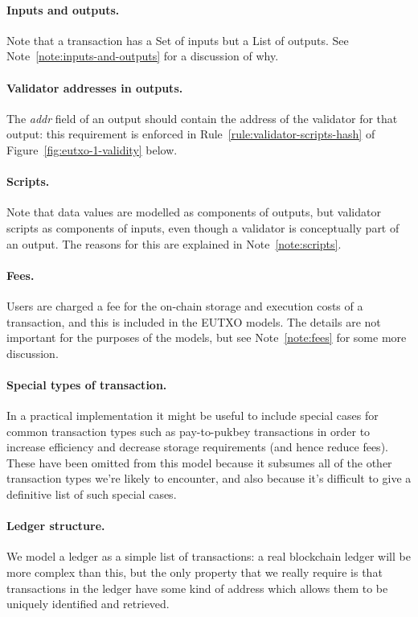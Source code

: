 \documentclass[a4paper]{article}
\newcounter{note}
\begin{document}
\paragraph{Inputs and outputs.} Note that a transaction has a
\textsf{Set} of inputs but a \textsf{List} of outputs. See
Note~\ref{note:inputs-and-outputs} for a discussion of why.

\paragraph{Validator addresses in outputs.} The \textit{addr} field
of an output should contain the address of the validator for
that output: this requirement is enforced in
Rule~\ref{rule:validator-scripts-hash} of
Figure~\ref{fig:eutxo-1-validity} below.

\paragraph{Scripts.} Note that data values are modelled as components
of outputs, but validator scripts as components of inputs, even though
a validator is conceptually part of an output.  The reasons for this
are explained in Note~\ref{note:scripts}.

\paragraph{Fees.}  Users are charged a fee for the on-chain storage
and execution costs of a transaction, and this is included in the
EUTXO models.  The details are not important for the purposes of the
models, but see Note~\ref{note:fees} for some more discussion.

\paragraph{Special types of transaction.} In a practical
implementation it might be useful to include special cases for common
transaction types such as pay-to-pukbey transactions in order to
increase efficiency and decrease storage requirements (and hence
reduce fees).  These have been omitted from this model because it
subsumes all of the other transaction types we're likely to encounter,
and also because it's difficult to give a definitive list of such
special cases.

\paragraph{Ledger structure.} We model a ledger as a simple
list of transactions: a real blockchain ledger will be more complex
than this, but the only property that we really require is that
transactions in the ledger have some kind of address which allows them
to be uniquely identified and retrieved.
\end{document}
